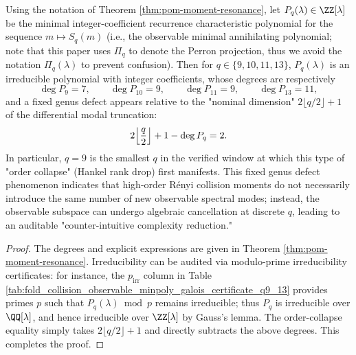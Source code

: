 \begin{proposition}[Nonlinear Order Collapse of Observable Minimal Polynomial: \texorpdfstring{$q=9,10,11,13$}{q=9,10,11,13} First Appearance of Fixed Genus Defect (Auditable)]\label{prop:pom-observable-minpoly-order-collapse-q9-13}
Using the notation of Theorem \ref{thm:pom-moment-resonance}, let \(P_q(\lambda)\in\ZZ[\lambda]\) be the minimal integer-coefficient recurrence characteristic polynomial for the sequence \(m\mapsto S_q(m)\) (i.e., the observable minimal annihilating polynomial; note that this paper uses \(\Pi_q\) to denote the Perron projection, thus we avoid the notation \(\Pi_q(\lambda)\) to prevent confusion).
Then for \(q\in\{9,10,11,13\}\), \(P_q(\lambda)\) is an irreducible polynomial with integer coefficients, whose degrees are respectively
\[
\deg P_9=7,\qquad \deg P_{10}=9,\qquad \deg P_{11}=9,\qquad \deg P_{13}=11,
\]
and a fixed genus defect appears relative to the "nominal dimension" \(2\lfloor q/2\rfloor+1\) of the differential modal truncation:
\[
2\Bigl\lfloor\frac{q}{2}\Bigr\rfloor+1-\deg P_q=2.
\]
In particular, \(q=9\) is the smallest \(q\) in the verified window at which this type of "order collapse" (Hankel rank drop) first manifests.
This fixed genus defect phenomenon indicates that high-order Rényi collision moments do not necessarily introduce the same number of new observable spectral modes; instead, the observable subspace can undergo algebraic cancellation at discrete \(q\), leading to an auditable "counter-intuitive complexity reduction."
\end{proposition}
\begin{proof}
The degrees and explicit expressions are given in Theorem \ref{thm:pom-moment-resonance}.
Irreducibility can be audited via modulo-prime irreducibility certificates: for instance, the \(p_{\mathrm{irr}}\) column in Table \ref{tab:fold_collision_observable_minpoly_galois_certificate_q9_13} provides primes \(p\) such that \(P_q(\lambda)\bmod p\) remains irreducible; thus \(P_q\) is irreducible over \(\QQ[\lambda]\), and hence irreducible over \(\ZZ[\lambda]\) by Gauss's lemma.
The order-collapse equality simply takes \(2\lfloor q/2\rfloor+1\) and directly subtracts the above degrees. This completes the proof.
\end{proof}

